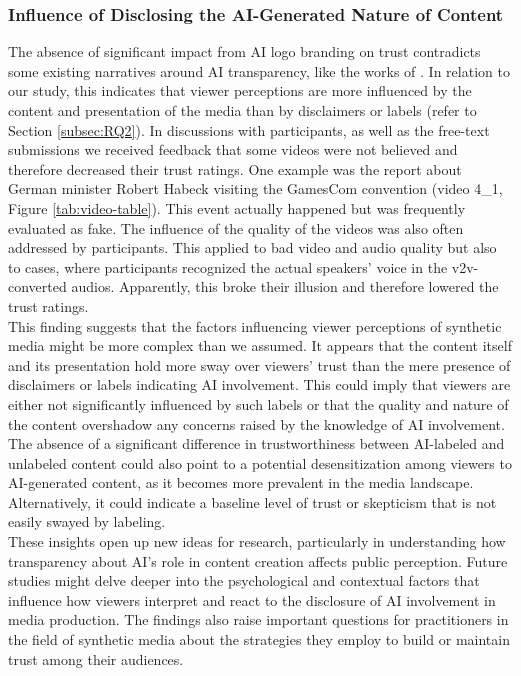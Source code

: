 \documentclass[
  a4paper,  %
  twoside,  %
  bibliography=totoc,
  headsepline,
  cleardoublepage=empty,
  parskip=half,
  draft=false
]{scrbook}
\begin{document}
\subsubsection{Influence of Disclosing the AI-Generated Nature of Content}
The absence of significant impact from AI logo branding on trust contradicts some existing narratives around AI transparency, like the works of . In relation to our study, this indicates that viewer perceptions are more influenced by the content and presentation of the media than by disclaimers or labels (refer to Section \ref{subsec:RQ2}). In discussions with participants, as well as the free-text submissions we received feedback that some videos were not believed and therefore decreased their trust ratings. One example was the report about German minister Robert Habeck visiting the GamesCom convention (video 4\_1, Figure \ref{tab:video-table}). This event actually happened but was frequently evaluated as fake. The influence of the quality of the videos was also often addressed by participants. This applied to bad video and audio quality but also to cases, where participants recognized the actual speakers' voice in the \gls{v2v}-converted audios. Apparently, this broke their illusion and therefore lowered the trust ratings. \\
This finding suggests that the factors influencing viewer perceptions of synthetic media might be more complex than we assumed. It appears that the content itself and its presentation hold more sway over viewers' trust than the mere presence of disclaimers or labels indicating AI involvement. This could imply that viewers are either not significantly influenced by such labels or that the quality and nature of the content overshadow any concerns raised by the knowledge of AI involvement. The absence of a significant difference in trustworthiness between AI-labeled and unlabeled content could also point to a potential desensitization among viewers to AI-generated content, as it becomes more prevalent in the media landscape. Alternatively, it could indicate a baseline level of trust or skepticism that is not easily swayed by labeling. \\
These insights open up new ideas for research, particularly in understanding how transparency about AI's role in content creation affects public perception. Future studies might delve deeper into the psychological and contextual factors that influence how viewers interpret and react to the disclosure of AI involvement in media production. The findings also raise important questions for practitioners in the field of synthetic media about the strategies they employ to build or maintain trust among their audiences.
\end{document}
